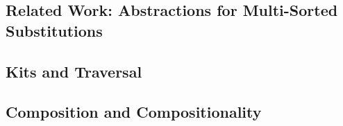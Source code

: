\documentclass[screen,nonacm]{acmart}
\begin{document}
\subsection{Related Work: Abstractions for Multi-Sorted Substitutions}


\subsection{Kits and Traversal}\label{sec:ags-kit}


\subsection{Composition and Compositionality}\label{sec:ags-kit}

\end{document}
